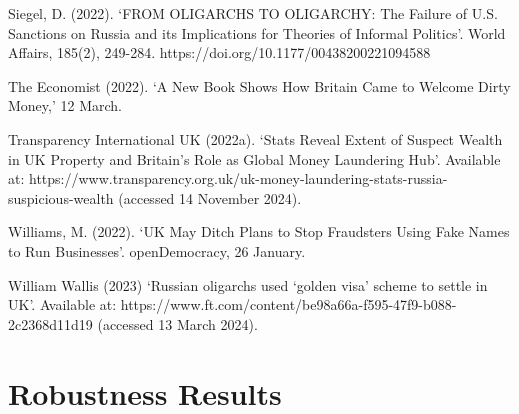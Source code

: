 \documentclass{article}
\begin{document}
\begin{thebibliography}{x}
\bibitem{}
Siegel, D. (2022). ‘FROM OLIGARCHS TO OLIGARCHY: The Failure of U.S. Sanctions on Russia and its Implications for Theories of Informal Politics’. World Affairs, 185(2), 249-284. https://doi.org/10.1177/00438200221094588

\bibitem{}
The Economist (2022). ‘A New Book Shows How Britain Came to Welcome Dirty Money,’ 12 March.

\bibitem{}
Transparency International UK (2022a). ‘Stats Reveal Extent of Suspect Wealth in UK Property and Britain’s Role as Global Money Laundering Hub’. Available at: https://www.transparency.org.uk/uk-money-laundering-stats-russia-suspicious-wealth (accessed 14 November 2024).

\bibitem{}
Williams, M. (2022). ‘UK May Ditch Plans to Stop Fraudsters Using Fake Names to Run Businesses’. openDemocracy, 26 January.

\bibitem{}
William Wallis (2023) ‘Russian oligarchs used ‘golden visa’ scheme to settle in UK’. Available at: https://www.ft.com/content/be98a66a-f595-47f9-b088-2c2368d11d19 (accessed 13 March 2024).


\end{thebibliography}

\appendix
\section{Robustness Results}
\end{document}
